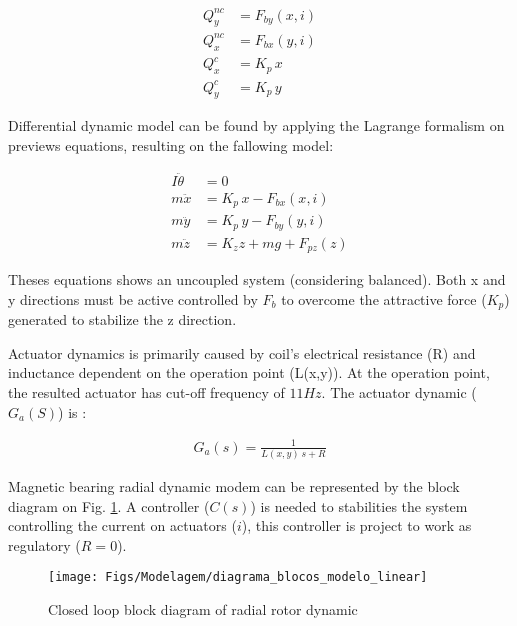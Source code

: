 \documentclass[10pt,fleqn,a4paper,twoside]{article}
\begin{document}
	\begin{align}
		Q_y^{nc} &= F_{by}(x,i)  \\
		Q_x^{nc} &= F_{bx}(y,i)  \\
		Q^{c}_x  &= K_p \, x \\
		Q^{c}_y  &= K_p \, y 
	\end{align}
	
	Differential dynamic model can be found by applying the Lagrange formalism on previews equations, resulting on the fallowing model:
			
	\begin{align}
		I \ddot{\theta} &= 0 \\
		m \ddot{x}		&= K_p \, x  - F_{bx}(x,i) \\
		m \ddot{y}		&= K_p \, y  - F_{by}(y,i)\\	
		m \ddot{z}  	&= K_z z + m g  + F_{pz}(z)
	\end{align}
	
	Theses equations shows an uncoupled system (considering balanced). Both x and y directions must be active controlled by $F_b$ to overcome the attractive force ($K_p$) generated to stabilize the z direction. 
	
	
		
	Actuator dynamics is primarily caused by coil's electrical resistance (R) and inductance dependent on the operation point (L(x,y)). At the operation point, the resulted actuator has cut-off frequency of $11Hz$. The actuator dynamic ($G_a(S)$) is :
	
	\begin{align}
		G_a(s) = \frac{1}{L(x,y) \, s + R} 
	\end{align}
	
	
	
	Magnetic bearing radial dynamic modem can be represented by the block diagram on Fig. \ref{fig:diagrama_blocos_modelo_linear}. A controller ($C(s)$) is needed to stabilities the system controlling the current on actuators ($i$), this controller is project to work as regulatory ($R=0$).
	
	\begin{figure}[ht]
	\centering
	\texttt{[image: Figs/Modelagem/diagrama\_blocos\_modelo\_linear]}
	\caption{Closed loop block diagram of radial rotor dynamic}
	\label{fig:diagrama_blocos_modelo_linear}
	\end{figure}	
	
\end{document}
